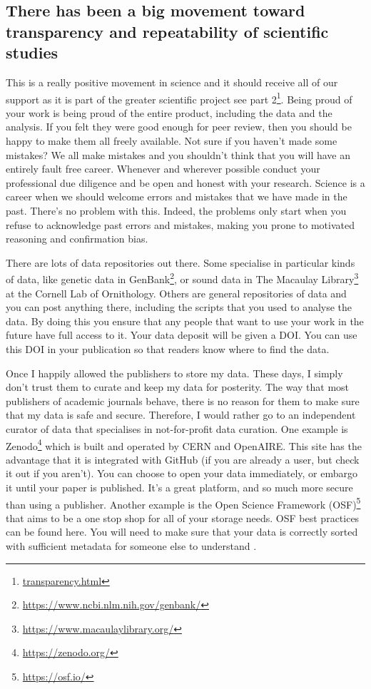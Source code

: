 \documentclass[
]{krantz}
\renewcommand{\href}[2]{#2\footnote{\url{#1}}}
\begin{document}
\hypertarget{there-has-been-a-big-movement-toward-transparency-and-repeatability-of-scientific-studies}{%
\subsection{There has been a big movement toward transparency and repeatability of scientific studies}\label{there-has-been-a-big-movement-toward-transparency-and-repeatability-of-scientific-studies}}

This is a really positive movement in science and it should receive all of our support as it is part of the greater scientific project \href{transparency.html}{see part 2}. Being proud of your work is being proud of the entire product, including the data and the analysis. If you felt they were good enough for peer review, then you should be happy to make them all freely available. Not sure if you haven't made some mistakes? We all make mistakes and you shouldn't think that you will have an entirely fault free career. Whenever and wherever possible conduct your professional due diligence and be open and honest with your research. Science is a career when we should welcome errors and mistakes that we have made in the past. There's no problem with this. Indeed, the problems only start when you refuse to acknowledge past errors and mistakes, making you prone to motivated reasoning and confirmation bias.

There are lots of data repositories out there. Some specialise in particular kinds of data, like genetic data in \href{https://www.ncbi.nlm.nih.gov/genbank/}{GenBank}, or sound data in \href{https://www.macaulaylibrary.org/}{The Macaulay Library} at the Cornell Lab of Ornithology. Others are general repositories of data and you can post anything there, including the scripts that you used to analyse the data. By doing this you ensure that any people that want to use your work in the future have full access to it. Your data deposit will be given a DOI. You can use this DOI in your publication so that readers know where to find the data.

Once I happily allowed the publishers to store my data. These days, I simply don't trust them to curate and keep my data for posterity. The way that most publishers of academic journals behave, there is no reason for them to make sure that my data is safe and secure. Therefore, I would rather go to an independent curator of data that specialises in not-for-profit data curation. One example is \href{https://zenodo.org/}{Zenodo} which is built and operated by CERN and OpenAIRE. This site has the advantage that it is integrated with GitHub (if you are already a user, but check it out if you aren't). You can choose to open your data immediately, or embargo it until your paper is published. It's a great platform, and so much more secure than using a publisher. Another example is the \href{https://osf.io/}{Open Science Framework (OSF)} that aims to be a one stop shop for all of your storage needs. OSF best practices can be found here. You will need to make sure that your data is correctly sorted with sufficient metadata for someone else to understand \citep[see][]{roche2015public}.
\end{document}
